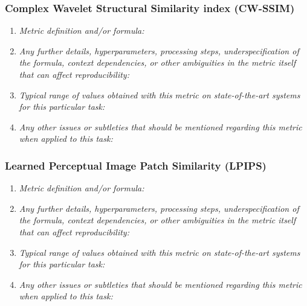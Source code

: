 \documentclass[a4paper,11pt]{article}
\begin{document}
        \subsubsection{Complex Wavelet Structural Similarity index (CW-SSIM)}
            \begin{enumerate}[label=\alph*.]
                \item \textit{Metric definition and/or formula:}
                \bigskip
                \item \textit{Any further details, hyperparameters, processing steps, underspecification of the formula, context dependencies, or other ambiguities in the metric itself that can affect reproducibility:}
                \bigskip
                \item \textit{Typical range of values obtained with this metric on state-of-the-art systems for this particular task:}
                \bigskip
                \item \textit{Any other issues or subtleties that should be mentioned regarding this metric when applied to this task:}
                \bigskip
            \end{enumerate}
        \subsubsection{Learned Perceptual Image Patch Similarity (LPIPS)}
            \begin{enumerate}[label=\alph*.]
                \item \textit{Metric definition and/or formula:}
                \bigskip
                \item \textit{Any further details, hyperparameters, processing steps, underspecification of the formula, context dependencies, or other ambiguities in the metric itself that can affect reproducibility:}
                \bigskip
                \item \textit{Typical range of values obtained with this metric on state-of-the-art systems for this particular task:}
                \bigskip
                \item \textit{Any other issues or subtleties that should be mentioned regarding this metric when applied to this task:}
                \bigskip
            \end{enumerate}
\end{document}
